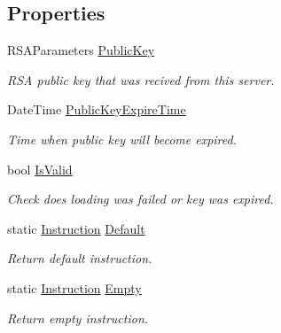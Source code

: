 \subsection*{Properties}
\begin{DoxyCompactItemize}
\item 
R\+S\+A\+Parameters \mbox{\hyperlink{class_pipes_provider_1_1_networking_1_1_routing_1_1_instruction_a8681a89ae14ad25d11ee0c588231b772}{Public\+Key}}
\begin{DoxyCompactList}\small\item\em R\+SA public key that was recived from this server. \end{DoxyCompactList}\item 
Date\+Time \mbox{\hyperlink{class_pipes_provider_1_1_networking_1_1_routing_1_1_instruction_a60281a347236a1311c37743b90596d58}{Public\+Key\+Expire\+Time}}
\begin{DoxyCompactList}\small\item\em Time when public key will become expired. \end{DoxyCompactList}\item 
bool \mbox{\hyperlink{class_pipes_provider_1_1_networking_1_1_routing_1_1_instruction_a07dbb5b97b3d9a28e5a318815d954278}{Is\+Valid}}
\begin{DoxyCompactList}\small\item\em Check does loading was failed or key was expired. \end{DoxyCompactList}\item 
static \mbox{\hyperlink{class_pipes_provider_1_1_networking_1_1_routing_1_1_instruction}{Instruction}} \mbox{\hyperlink{class_pipes_provider_1_1_networking_1_1_routing_1_1_instruction_a7b1790dc22b0fd1a11b447e207245e83}{Default}}
\begin{DoxyCompactList}\small\item\em Return default instruction. \end{DoxyCompactList}\item 
static \mbox{\hyperlink{class_pipes_provider_1_1_networking_1_1_routing_1_1_instruction}{Instruction}} \mbox{\hyperlink{class_pipes_provider_1_1_networking_1_1_routing_1_1_instruction_aad2d50b60ddcdd0c7d0671ced01a5480}{Empty}}
\begin{DoxyCompactList}\small\item\em Return empty instruction. \end{DoxyCompactList}\end{DoxyCompactItemize}
